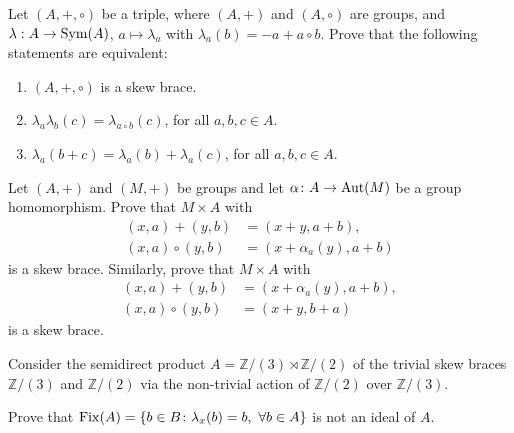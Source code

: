 \begin{exercise}
    Let $(A,+,\circ)$ be a triple, where $(A,+)$ and $(A,\circ)$ are groups, and $\lambda: A \to \operatorname{Sym}(A)$, $a\mapsto \lambda_a$ with $\lambda_a(b)=-a+a\circ b$. Prove that the following statements are equivalent:
    \begin{enumerate}
        \item $(A,+,\circ)$ is a skew brace.
        \item $\lambda_a\lambda_b(c)=\lambda_{a\circ b}(c)$, for all $a,b,c\in A$.
        \item $\lambda_a(b+c) = \lambda_a(b)+\lambda_a(c)$, for all $a,b,c\in A$.
    \end{enumerate}
\end{exercise}

\begin{exercise}\label{ex:sd}
    	Let $(A,+)$ and $(M,+)$ be groups and let $\alpha\colon A\to\operatorname{Aut}(M)$ be a
    	group homomorphism. Prove that $M\times A$ with 
    	\begin{align*}
        	(x,a)+(y,b)&=(x+y,a+b),
        	\\
        	(x,a)\circ (y,b)&=(x+\alpha_a(y),a+b)
    	\end{align*}
    	is a skew brace. Similarly, prove that $M\times A$ with
    	\begin{align*}
        	(x,a)+(y,b)&=(x+\alpha_a(y),a+b),\\
        	(x,a)\circ (y,b)&=(x+y,b+a)
    	\end{align*}
    	is a skew brace. 
    \end{exercise}

    


\begin{exercise}\label{ex:fix}
    Consider the semidirect product $A= \mathbb{Z}/(3) \rtimes \mathbb{Z}/(2)$ of the trivial
    skew braces $\mathbb{Z}/(3)$ and $\mathbb{Z}/(2)$ via the non-trivial action of $\mathbb{Z}/(2)$ over $\mathbb{Z}/(3)$.
    
    Prove that $\operatorname{Fix}(A)=\{b \in B\colon \lambda_x(b)=b,\ \forall b\in A\}$ is not an ideal of $A$.
\end{exercise}
